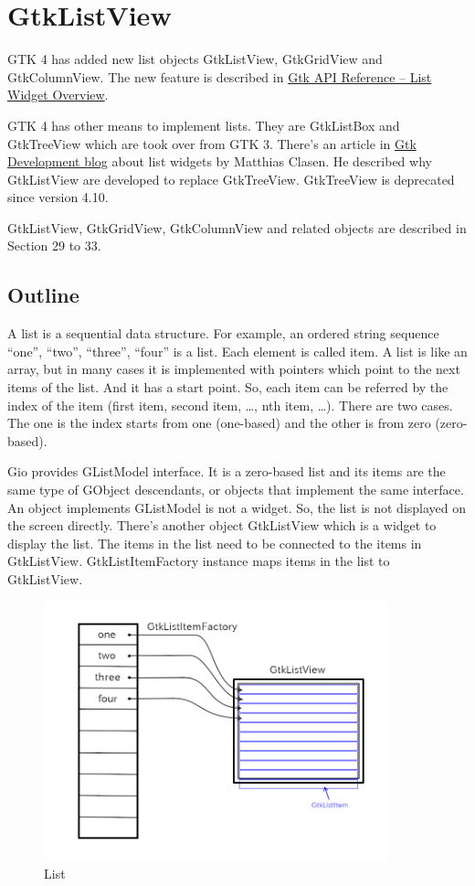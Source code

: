 \section{GtkListView}\label{gtklistview}

GTK 4 has added new list objects GtkListView, GtkGridView and
GtkColumnView. The new feature is described in
\href{https://docs.gtk.org/gtk4/section-list-widget.html}{Gtk API
Reference -- List Widget Overview}.

GTK 4 has other means to implement lists. They are GtkListBox and
GtkTreeView which are took over from GTK 3. There's an article in
\href{https://blog.gtk.org/2020/06/07/scalable-lists-in-gtk-4/}{Gtk
Development blog} about list widgets by Matthias Clasen. He described
why GtkListView are developed to replace GtkTreeView. GtkTreeView is
deprecated since version 4.10.

GtkListView, GtkGridView, GtkColumnView and related objects are
described in Section 29 to 33.

\subsection{Outline}\label{outline}

A list is a sequential data structure. For example, an ordered string
sequence ``one'', ``two'', ``three'', ``four'' is a list. Each element
is called item. A list is like an array, but in many cases it is
implemented with pointers which point to the next items of the list. And
it has a start point. So, each item can be referred by the index of the
item (first item, second item, \ldots, nth item, \ldots). There are two
cases. The one is the index starts from one (one-based) and the other is
from zero (zero-based).

Gio provides GListModel interface. It is a zero-based list and its items
are the same type of GObject descendants, or objects that implement the
same interface. An object implements GListModel is not a widget. So, the
list is not displayed on the screen directly. There's another object
GtkListView which is a widget to display the list. The items in the list
need to be connected to the items in GtkListView. GtkListItemFactory
instance maps items in the list to GtkListView.

\begin{figure}
\centering
\includegraphics[width=10cm,height=7.5cm]{../image/list.png}
\caption{List}
\end{figure}

